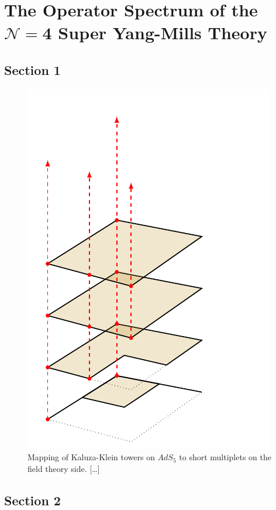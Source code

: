 %
%
\chapter{The Operator Spectrum of the \texorpdfstring{$\boldsymbol{\mathcal N=4}$}{N=4} Super Yang-Mills Theory}%
%
\label{chapter:operator_spectrum}

\section{Section 1}
\lipsum[31-32]

\begin{figure}[!hbt]
\centering
\caption[Mapping of Kaluza-Klein towers on $AdS_5$ to short multiplets]{Mapping
of Kaluza-Klein towers on $AdS_5$ to short multiplets on the field theory
side. [\dots]}%
\label{fig:KK_towers}
\includegraphics{img/3d_towers_no_text}
\end{figure}

\lipsum[33-35]

\section{Section 2}
\lipsum[36-40]
